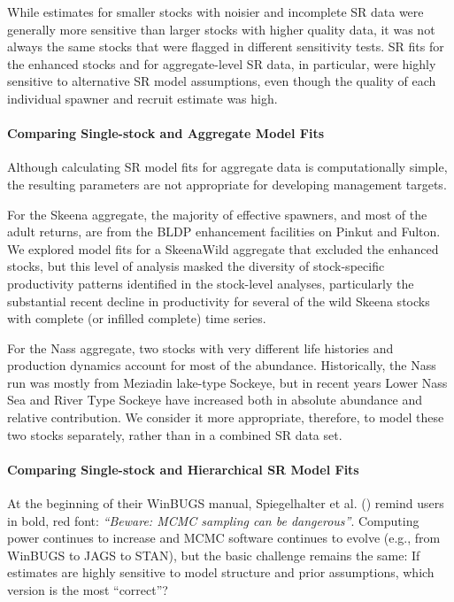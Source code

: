 \documentclass[french,11pt]{book}
\begin{document}
While estimates for smaller stocks with noisier and incomplete SR data were generally more sensitive than larger stocks with higher quality data, it was not always the same stocks that were flagged in different sensitivity tests. SR fits for the enhanced stocks and for aggregate-level SR data, in particular, were highly sensitive to alternative SR model assumptions, even though the quality of each individual spawner and recruit estimate was high.

\paragraph{Comparing Single-stock and Aggregate Model Fits}\label{comparing-single-stock-and-aggregate-model-fits}

Although calculating SR model fits for aggregate data is computationally simple, the resulting parameters are not appropriate for developing management targets.

For the Skeena aggregate, the majority of effective spawners, and most of the adult returns, are from the BLDP enhancement facilities on Pinkut and Fulton. We explored model fits for a SkeenaWild aggregate that excluded the enhanced stocks, but this level of analysis masked the diversity of stock-specific productivity patterns identified in the stock-level analyses, particularly the substantial recent decline in productivity for several of the wild Skeena stocks with complete (or infilled complete) time series.

For the Nass aggregate, two stocks with very different life histories and production dynamics account for most of the abundance. Historically, the Nass run was mostly from Meziadin lake-type Sockeye, but in recent years Lower Nass Sea and River Type Sockeye have increased both in absolute abundance and relative contribution. We consider it more appropriate, therefore, to model these two stocks separately, rather than in a combined SR data set.

\paragraph{Comparing Single-stock and Hierarchical SR Model Fits}\label{comparing-single-stock-and-hierarchical-sr-model-fits}

At the beginning of their WinBUGS manual, Spiegelhalter et al. () remind users in bold, red font: \emph{``Beware: MCMC sampling can be dangerous''}. Computing power continues to increase and MCMC software continues to evolve (e.g., from WinBUGS to JAGS to STAN), but the basic challenge remains the same: If estimates are highly sensitive to model structure and prior assumptions, which version is the most ``correct''?
\end{document}
